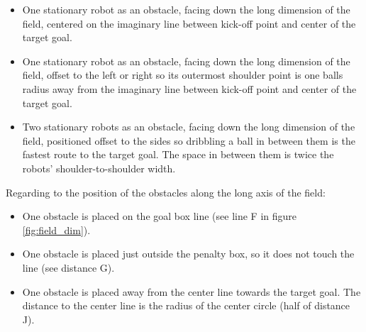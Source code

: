\begin{itemize}
	\item One stationary robot as an obstacle, facing down the long dimension of the field, centered on the imaginary line between kick-off point and center of the target goal.
	\item One stationary robot as an obstacle, facing down the long dimension of the field, offset to the left or right so its outermost shoulder point is one balls radius away from the imaginary line between kick-off point and center of the target goal. %
	\item Two stationary robots as an obstacle, facing down the long dimension of the field, positioned offset to the sides so dribbling a ball in between them is the fastest route to the target goal. The space in between them is twice the robots' shoulder-to-shoulder width. %
\end{itemize}

Regarding to the position of the obstacles along the long axis of the field:

\begin{itemize}
	\item One obstacle is placed on the goal box line (see line F in figure \ref{fig:field_dim}).
	\item One obstacle is placed just outside the penalty box, so it does not touch the line (see distance  G).
	\item One obstacle is placed away from the center line towards the target goal. The distance to the center line is the radius of the center circle (half of distance J).
\end{itemize}

